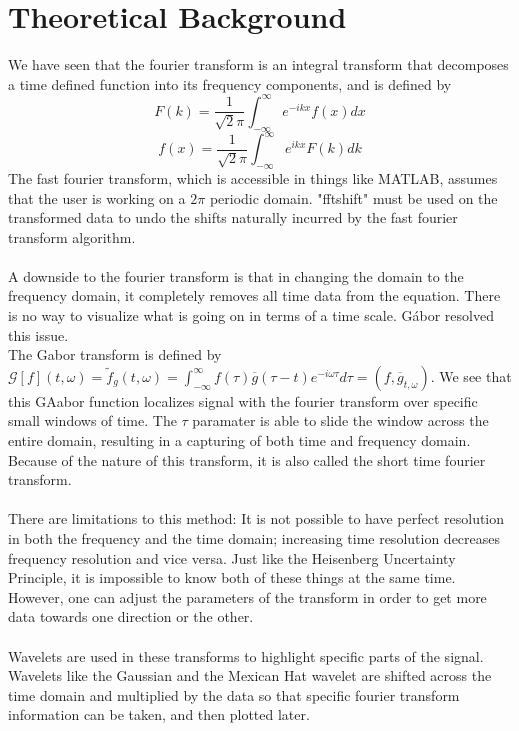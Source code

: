 \documentclass{article}
\begin{document}
\section*{\fontsize{19}{15}\selectfont Theoretical Background}
	We have seen that the fourier transform is an integral transform that decomposes a time defined function into its frequency components, and is defined by
	\begin{equation} \label{eq:2a}
		F(k) = \frac{1}{\sqrt2\pi} \int_{-\infty}^{\infty} e^{-ikx} f(x) dx
	\end{equation}
		\begin{equation} \label{eq:2b}
		f(x) = \frac{1}{\sqrt2\pi} \int_{-\infty}^{\infty} e^{ikx} F(k) dk
	\end{equation}
	The fast fourier transform, which is accessible in things like MATLAB, assumes that the user is working on a $2\pi$ periodic domain. "fftshift" must be used on the transformed data to undo the shifts naturally incurred by the fast fourier transform algorithm. \\ \\
A downside to the fourier transform is that in changing the domain to the frequency domain, it completely removes all time data from the equation. There is no way to visualize what is going on in terms of a time scale. G\'abor resolved this issue. \\
The Gabor transform is defined by $\mathcal { G } [ f ] ( t , \omega ) = \tilde { f } _ { g } ( t , \omega ) = \int _ { - \infty } ^ { \infty } f ( \tau ) \overline { g } ( \tau - t ) e ^ { - i \omega \tau } d \tau = \left( f , \overline { g } _ { t , \omega } \right)$. We see that this GAabor function localizes signal with the fourier transform over specific small windows of time. The $\tau$ paramater is able to slide the window across the entire domain, resulting in a capturing of both time and frequency domain. Because of the nature of this transform, it is also called the short time fourier transform. \\ \\
There are limitations to this method: It is not possible to have perfect resolution in both the frequency and the time domain; increasing time resolution decreases frequency resolution and vice versa. Just like the Heisenberg Uncertainty Principle, it is impossible to know both of these things at the same time. However, one can adjust the parameters of the transform in order to get more data towards one direction or the other. \\ \\
Wavelets are used in these transforms to highlight specific parts of the signal. Wavelets like the Gaussian and the Mexican Hat wavelet are shifted across the time domain and multiplied by the data so that specific fourier transform information can be taken, and then plotted later.
\end{document}
